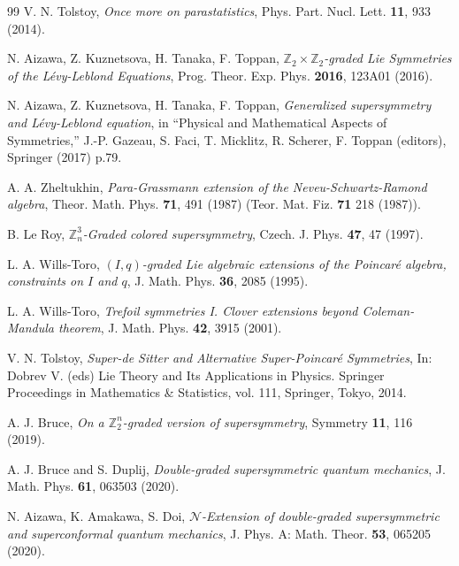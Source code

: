 \documentclass[a4paper,12pt]{article}
\theoremstyle{plain}
\theoremstyle{definition}
\begin{document}
\begin{thebibliography}{99}
 V. N. Tolstoy, 
\textit{Once more on parastatistics}, Phys. Part. Nucl. Lett. {\bf{11}},  933 (2014).

 N. Aizawa,  Z. Kuznetsova, H. Tanaka, F. Toppan,
\textit{${\mathbb Z}_2\times {\mathbb Z}_2$-graded Lie Symmetries of the L\'evy-Leblond Equations}, 
Prog. Theor. Exp. Phys. \textbf{2016}, 123A01 (2016).

 N. Aizawa,  Z. Kuznetsova, H. Tanaka, F. Toppan,
\textit{Generalized supersymmetry and L\'evy-Leblond equation}, 
in ``Physical and Mathematical Aspects of Symmetries,''
J.-P. Gazeau, S. Faci, T. Micklitz, R. Scherer, F. Toppan (editors),  
Springer (2017) p.79.

 A. A. Zheltukhin, 
\textit{Para-Grassmann extension of the Neveu-Schwartz-Ramond algebra}, Theor. Math. Phys. {\bf 71},  491  (1987) (Teor. Mat. Fiz. {\bf 71}  218 (1987)).

 B. Le Roy, 
\textit{$\mathbb{Z}_n^3$-Graded colored supersymmetry}, Czech. J. Phys. \textbf{47}, 47 (1997).

 L. A. Wills-Toro, 
\textit{$(I,q)$-graded Lie algebraic extensions of the Poincar\'e algebra, constraints on $I$ and $q$}, J. Math. Phys. \textbf{36}, 2085 (1995).

 L. A. Wills-Toro, 
\textit{Trefoil symmetries I. Clover extensions beyond Coleman-Mandula theorem}, J. Math. Phys. \textbf{42}, 3915  (2001). 

 V. N. Tolstoy,  
\textit{Super-de Sitter and Alternative Super-Poincar\'e Symmetries},  
In: Dobrev V. (eds) Lie Theory and Its Applications in Physics. Springer Proceedings in Mathematics \& Statistics, 
vol. 111, Springer, Tokyo, 2014.

 A. J. Bruce, 
\textit{On a $\mathbb{Z}_2^n$-graded version of supersymmetry}, Symmetry \textbf{11}, 116 (2019).


 A. J. Bruce and S. Duplij, 
{\it Double-graded supersymmetric quantum mechanics},
J. Math. Phys.  \textbf{61}, 063503 (2020).

N. Aizawa, K. Amakawa, S. Doi, 
{\it $\mathcal{N}$-Extension of double-graded supersymmetric and superconformal quantum mechanics}, 
J. Phys. A: Math. Theor. \textbf{53}, 065205 (2020).



\end{thebibliography}
\end{document}
